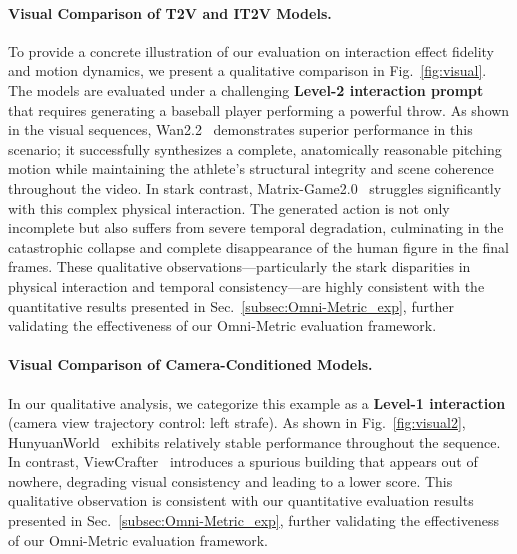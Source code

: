 \paragraph{Visual Comparison of T2V and IT2V Models.} To provide a concrete illustration of our evaluation on interaction effect fidelity and motion dynamics, we present a qualitative comparison in Fig.~\ref{fig:visual}. The models are evaluated under a challenging \textbf{Level-2 interaction prompt} that requires generating a baseball player performing a powerful throw. As shown in the visual sequences, Wan2.2~\cite{wan2025} demonstrates superior performance in this scenario; it successfully synthesizes a complete, anatomically reasonable pitching motion while maintaining the athlete's structural integrity and scene coherence throughout the video. In stark contrast, Matrix-Game2.0~\cite{he2025matrix} struggles significantly with this complex physical interaction. The generated action is not only incomplete but also suffers from severe temporal degradation, culminating in the catastrophic collapse and complete disappearance of the human figure in the final frames. These qualitative observations—particularly the stark disparities in physical interaction and temporal consistency—are highly consistent with the quantitative results presented in Sec.~\ref{subsec:Omni-Metric_exp}, further validating the effectiveness of our Omni-Metric evaluation framework.




\paragraph{Visual Comparison of Camera-Conditioned Models.} In our qualitative analysis, we categorize this example as a \textbf{Level-1 interaction} (camera view trajectory control: left strafe). As shown in Fig.~\ref{fig:visual2}, HunyuanWorld~\cite{hyworld2025} exhibits relatively stable performance throughout the sequence. In contrast, ViewCrafter~\cite{yu2024viewcrafter} introduces a spurious building that appears out of nowhere, degrading visual consistency and leading to a lower score. This qualitative observation is consistent with our quantitative evaluation results presented in Sec.~\ref{subsec:Omni-Metric_exp}, further validating the effectiveness of our Omni-Metric evaluation framework.




























